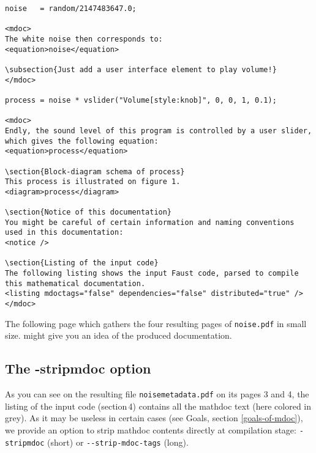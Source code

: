\begin{lstlisting}
noise   = random/2147483647.0;

<mdoc>
The white noise then corresponds to:
<equation>noise</equation>

\subsection{Just add a user interface element to play volume!}
</mdoc>

process = noise * vslider("Volume[style:knob]", 0, 0, 1, 0.1);

<mdoc>
Endly, the sound level of this program is controlled by a user slider, which gives the following equation: 
<equation>process</equation>

\section{Block-diagram schema of process}
This process is illustrated on figure 1.
<diagram>process</diagram>

\section{Notice of this documentation}
You might be careful of certain information and naming conventions used in this documentation:
<notice />

\section{Listing of the input code}
The following listing shows the input Faust code, parsed to compile this mathematical documentation.
<listing mdoctags="false" dependencies="false" distributed="true" />
</mdoc>
\end{lstlisting}
\normalsize

The following page which gathers the four resulting pages of \lstinline!noise.pdf! in small size. might give you an idea of the produced documentation.


\subsection{The -stripmdoc option}
\label{striping-option}

As you can see on the resulting file \lstinline!noisemetadata.pdf! on its pages 3 and 4, the listing of the input code (section\,4) contains all the mathdoc text (here colored in grey). As it may be useless in certain cases (see Goals, section \ref{goals-of-mdoc}), we provide an option to strip mathdoc contents directly at compilation stage: \lstinline!-stripmdoc! (short) or \lstinline!--strip-mdoc-tags! (long).


